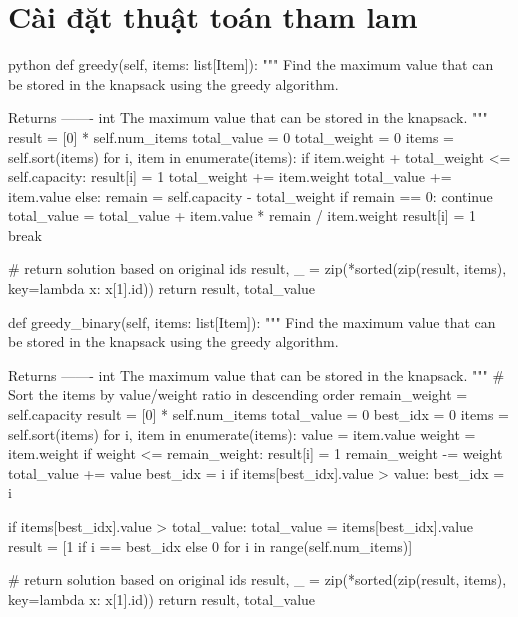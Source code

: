 \section{Cài đặt thuật toán tham lam}

\begin{mintedbox}{python}
    def greedy(self, items: list[Item]):
        """
        Find the maximum value that can be stored in the knapsack using the greedy algorithm.

        Returns
        -------
        int
            The maximum value that can be stored in the knapsack.
        """
        result = [0] * self.num_items
        total_value = 0
        total_weight = 0
        items = self.sort(items)
        for i, item in enumerate(items):
            if item.weight + total_weight <= self.capacity:
                result[i] = 1
                total_weight += item.weight
                total_value += item.value
            else:
                remain = self.capacity - total_weight
                if remain == 0:
                    continue
                total_value = total_value + item.value * remain / item.weight
                result[i] = 1
                break

        # return solution based on original ids
        result, _ = zip(*sorted(zip(result, items), key=lambda x: x[1].id))
        return result, total_value

    def greedy_binary(self, items: list[Item]):
        """
        Find the maximum value that can be stored in the knapsack using the greedy algorithm.

        Returns
        -------
        int
            The maximum value that can be stored in the knapsack.
        """
        # Sort the items by value/weight ratio in descending order
        remain_weight = self.capacity
        result = [0] * self.num_items
        total_value = 0
        best_idx = 0
        items = self.sort(items)
        for i, item in enumerate(items):
            value = item.value
            weight = item.weight
            if weight <= remain_weight:
                result[i] = 1
                remain_weight -= weight
                total_value += value
                best_idx = i
            if items[best_idx].value > value:
                best_idx = i

        if items[best_idx].value > total_value:
            total_value = items[best_idx].value
            result = [1 if i == best_idx else 0 for i in range(self.num_items)]

        # return solution based on original ids
        result, _ = zip(*sorted(zip(result, items), key=lambda x: x[1].id))
        return result, total_value
\end{mintedbox}

